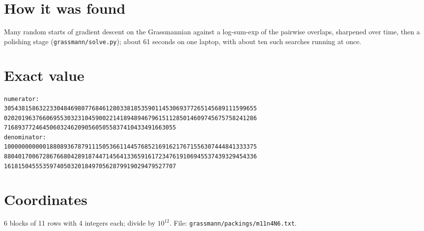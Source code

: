 \documentclass[11pt,a4paper]{article}
\begin{document}
\section{How it was found}
Many random starts of gradient descent on the Grassmannian against a log-sum-exp of the pairwise overlaps, sharpened over time, then a polishing stage (\texttt{grassmann/solve.py}); about 61 seconds on one laptop, with about ten such searches running at once.


\appendix
\section{Exact value}
{\small
\begin{verbatim}
numerator:
305438158632233048469807768461280338185359011453069377265145689111599655
020201963766069553032310459002214189489467961511285014609745675758241286
7168937724645060324620905605055837410433491663055
denominator:
100000000000188089367879111505366114457685216916217671556307444841333375
880401700672867668042891874471456413365916172347619106945537439329454336
1618150455535974050320184970562879919029479527707
\end{verbatim}}

\section{Coordinates}
6 blocks of 11 rows with 4 integers each; divide by $10^{12}$. File: \texttt{grassmann/packings/m11n4N6.txt}.
{\tiny
\begin{multicols}{3}
\end{multicols}}
\end{document}
